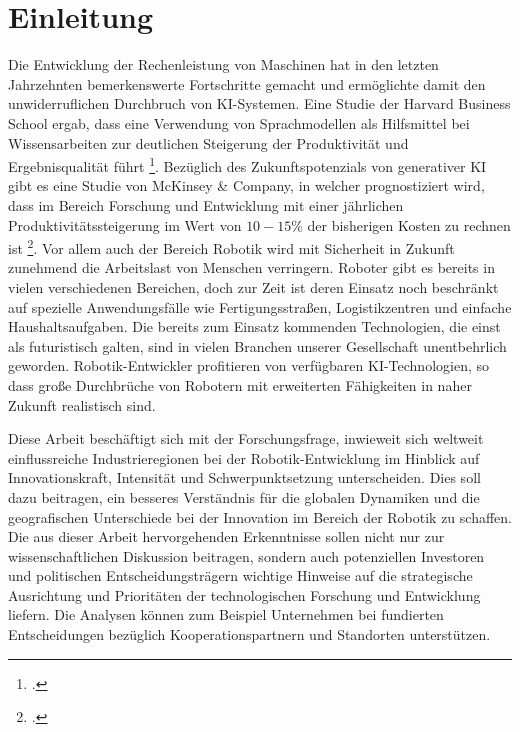 \section{Einleitung}\label{sec:einleitung}

Die Entwicklung der Rechenleistung von Maschinen hat in den letzten Jahrzehnten bemerkenswerte Fortschritte gemacht und ermöglichte damit den unwiderruflichen Durchbruch von KI-Systemen. Eine Studie der Harvard Business School ergab, dass eine Verwendung von Sprachmodellen als Hilfsmittel bei Wissensarbeiten zur deutlichen Steigerung der Produktivität und Ergebnisqualität führt \footcite{prod_llm_study}. Bezüglich des Zukunftspotenzials von generativer KI gibt es eine Studie von McKinsey \& Company, in welcher prognostiziert wird, dass im Bereich Forschung und Entwicklung mit einer jährlichen Produktivitätssteigerung im Wert von $10-15\%$ der bisherigen Kosten zu rechnen ist \footcite{study_mckinsey}. Vor allem auch der Bereich Robotik wird mit Sicherheit in Zukunft zunehmend die Arbeitslast von Menschen verringern. Roboter gibt es bereits in vielen verschiedenen Bereichen, doch zur Zeit ist deren Einsatz noch beschränkt auf spezielle Anwendungsfälle wie Fertigungsstraßen, Logistikzentren und einfache Haushaltsaufgaben. Die bereits zum Einsatz kommenden Technologien, die einst als futuristisch galten, sind in vielen Branchen unserer Gesellschaft unentbehrlich geworden. Robotik-Entwickler profitieren von verfügbaren KI-Technologien, so dass große Durchbrüche von Robotern mit erweiterten Fähigkeiten in naher Zukunft realistisch sind. 

Diese Arbeit beschäftigt sich mit der Forschungsfrage, inwieweit sich weltweit einflussreiche Industrieregionen bei der Robotik-Entwicklung im Hinblick auf Innovationskraft, Intensität und Schwerpunktsetzung unterscheiden. 
Dies soll dazu beitragen, ein besseres Verständnis für die globalen Dynamiken und die geografischen Unterschiede bei der Innovation im Bereich der Robotik zu schaffen. Die aus dieser Arbeit hervorgehenden Erkenntnisse sollen nicht nur zur wissenschaftlichen Diskussion beitragen, sondern auch potenziellen Investoren und politischen Entscheidungsträgern wichtige Hinweise auf die strategische Ausrichtung und Prioritäten der technologischen Forschung und Entwicklung liefern. Die Analysen können zum Beispiel Unternehmen bei fundierten Entscheidungen bezüglich Kooperationspartnern und Standorten unterstützen.

